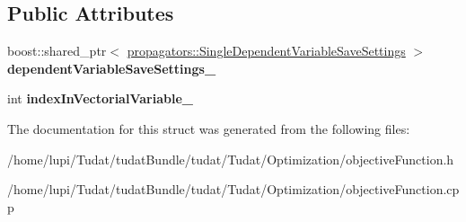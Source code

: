 \subsection*{Public Attributes}
\begin{DoxyCompactItemize}
\item 
boost\+::shared\+\_\+ptr$<$ \hyperlink{classtudat_1_1propagators_1_1SingleDependentVariableSaveSettings}{propagators\+::\+Single\+Dependent\+Variable\+Save\+Settings} $>$ {\bfseries dependent\+Variable\+Save\+Settings\+\_\+}\hypertarget{structtudat_1_1optimization_1_1ObjectiveFunctionFromFinalDependentVariableSettings_ab0cc0402ae43353f0a024788ea1196eb}{}\label{structtudat_1_1optimization_1_1ObjectiveFunctionFromFinalDependentVariableSettings_ab0cc0402ae43353f0a024788ea1196eb}

\item 
int {\bfseries index\+In\+Vectorial\+Variable\+\_\+}\hypertarget{structtudat_1_1optimization_1_1ObjectiveFunctionFromFinalDependentVariableSettings_a828e7f6481225fc140eb1c7dff74c799}{}\label{structtudat_1_1optimization_1_1ObjectiveFunctionFromFinalDependentVariableSettings_a828e7f6481225fc140eb1c7dff74c799}

\end{DoxyCompactItemize}


The documentation for this struct was generated from the following files\+:\begin{DoxyCompactItemize}
\item 
/home/lupi/\+Tudat/tudat\+Bundle/tudat/\+Tudat/\+Optimization/objective\+Function.\+h\item 
/home/lupi/\+Tudat/tudat\+Bundle/tudat/\+Tudat/\+Optimization/objective\+Function.\+cpp\end{DoxyCompactItemize}

